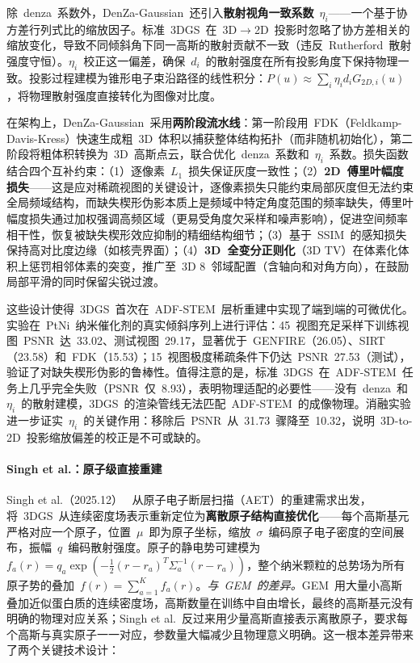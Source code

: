 除~denza~系数外，DenZa-Gaussian~还引入\textbf{散射视角一致系数}~$\eta_i$——一个基于协方差行列式比的缩放因子。标准~3DGS~在~3D$\to$2D~投影时忽略了协方差相关的缩放变化，导致不同倾斜角下同一高斯的散射贡献不一致（违反~Rutherford~散射强度守恒）。$\eta_i$~校正这一偏差，确保~$d_i$~的散射强度在所有投影角度下保持物理一致。投影过程建模为锥形电子束沿路径的线性积分：$P(u) \approx \sum_i \eta_i d_i G_{2D,i}(u)$，将物理散射强度直接转化为图像对比度。

在架构上，DenZa-Gaussian~采用\textbf{两阶段流水线}：第一阶段用~FDK（Feldkamp-Davis-Kress）快速生成粗~3D~体积以捕获整体结构拓扑（而非随机初始化），第二阶段将粗体积转换为~3D~高斯点云，联合优化~denza~系数和~$\eta_i$~系数。损失函数结合四个互补约束：（1）逐像素~$L_1$~损失保证灰度一致性；（2）\textbf{2D~傅里叶幅度损失}——这是应对稀疏视图的关键设计，逐像素损失只能约束局部灰度但无法约束全局频域结构，而缺失楔形伪影本质上是频域中特定角度范围的频率缺失，傅里叶幅度损失通过加权强调高频区域（更易受角度欠采样和噪声影响），促进空间频率相干性，恢复被缺失楔形效应抑制的精细结构细节；（3）基于~SSIM~的感知损失保持高对比度边缘（如核壳界面）；（4）\textbf{3D~全变分正则化}（3D TV）在体素化体积上惩罚相邻体素的突变，推广至~3D 8~邻域配置（含轴向和对角方向），在鼓励局部平滑的同时保留尖锐过渡。

这些设计使得~3DGS~首次在~ADF-STEM~层析重建中实现了端到端的可微优化。实验在~PtNi~纳米催化剂的真实倾斜序列上进行评估：45~视图充足采样下训练视图~PSNR~达~33.02、测试视图~29.17，显著优于~GENFIRE（26.05）、SIRT（23.58）和~FDK（15.53）；15~视图极度稀疏条件下仍达~PSNR~27.53（测试），验证了对缺失楔形伪影的鲁棒性。值得注意的是，标准~3DGS~在~ADF-STEM~任务上几乎完全失败（PSNR~仅~8.93），表明物理适配的必要性——没有~denza~和~$\eta_i$~的散射建模，3DGS~的渲染管线无法匹配~ADF-STEM~的成像物理。消融实验进一步证实~$\eta_i$~的关键作用：移除后~PSNR~从~31.73~骤降至~10.32，说明~3D-to-2D~投影缩放偏差的校正是不可或缺的。

\paragraph{Singh et al.：原子级直接重建}

Singh et al.（2025.12）~\cite{2512_15034} 从原子电子断层扫描（AET）的重建需求出发，将~3DGS~从连续密度场表示重新定位为\textbf{离散原子结构直接优化}——每个高斯基元严格对应一个原子，位置~$\mu$~即为原子坐标，缩放~$\sigma$~编码原子电子密度的空间展布，振幅~$q$~编码散射强度。原子的静电势可建模为~$f_a(r) = q_a \exp(-\frac{1}{2}(r - r_a)^T \Sigma_a^{-1}(r - r_a))$，整个纳米颗粒的总势场为所有原子势的叠加~$f(r) = \sum_{a=1}^{K} f_a(r)$。\textit{与~GEM~的差异。}GEM~用大量小高斯叠加近似蛋白质的连续密度场，高斯数量在训练中自由增长，最终的高斯基元没有明确的物理对应关系；Singh et al.~反过来用少量高斯直接表示离散原子，要求每个高斯与真实原子一一对应，参数量大幅减少且物理意义明确。这一根本差异带来了两个关键技术设计：

